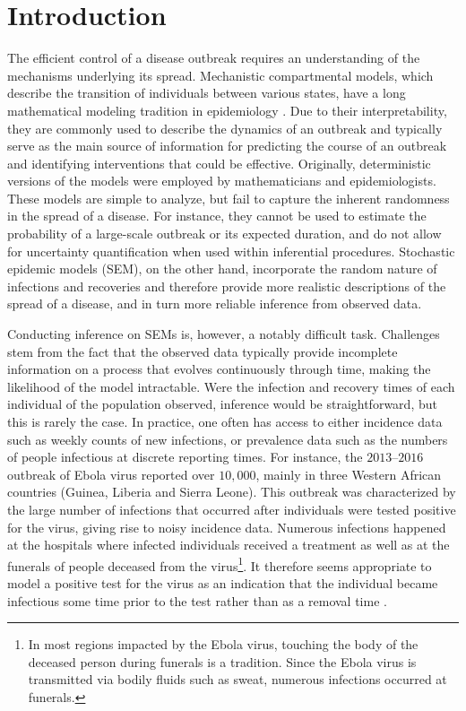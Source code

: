 \documentclass[11pt]{article}
\newcommand{\jx}[1]{{\color{blue}{ #1}}}
\begin{document}
	\section{Introduction}
	
	The efficient control of a disease outbreak requires an understanding of the mechanisms underlying its spread. Mechanistic compartmental models, which describe the transition of individuals between various states, have a long mathematical modeling tradition in epidemiology \cite{Kermack.1927}. Due to their interpretability, they are commonly used to describe the dynamics of an outbreak and typically serve as the main source of information for predicting the course of an outbreak and identifying interventions that could be effective. Originally, deterministic versions of the models were employed by mathematicians and epidemiologists. These models are simple to analyze, but fail to capture the inherent randomness in the spread of a disease. For instance, they cannot be used to estimate the probability of a large-scale outbreak or its expected duration, and do not allow for uncertainty quantification when used within inferential procedures. Stochastic epidemic models (SEM), on the other hand, incorporate the random nature of infections and recoveries and therefore provide more realistic descriptions of the spread of a disease, and in turn more reliable inference from observed data.
	
	Conducting inference on SEMs is, however, a notably difficult task. Challenges stem from the fact that the observed data typically provide incomplete information on a process that evolves continuously through time, making the likelihood of the model intractable. Were the infection and recovery times of each individual of the population observed, inference would be straightforward, but this is rarely the case. In practice, one often has access to either incidence data such as weekly counts of new infections, or prevalence data such as the numbers of people infectious at discrete reporting times. For instance, the $2013$–$2016$ outbreak of Ebola virus reported over $10,000$, mainly in three Western African countries (Guinea, Liberia and Sierra Leone). This outbreak was characterized by the large number of infections that occurred after individuals were tested positive for the virus, giving rise to noisy incidence data. Numerous infections happened at the hospitals where infected individuals received a treatment as well as at the funerals of people deceased from the virus\footnote{In most regions impacted by the Ebola virus, touching the body of the deceased person during funerals is a tradition. Since the Ebola virus is transmitted via bodily fluids such as sweat, numerous infections occurred at funerals.}. 
	It therefore seems appropriate to model a positive test for the virus as an indication that the individual became infectious some time prior to the test rather than as a removal time \jx{to do: stronger transition tying back to goal of partial observed inference}. 
	
\end{document}
